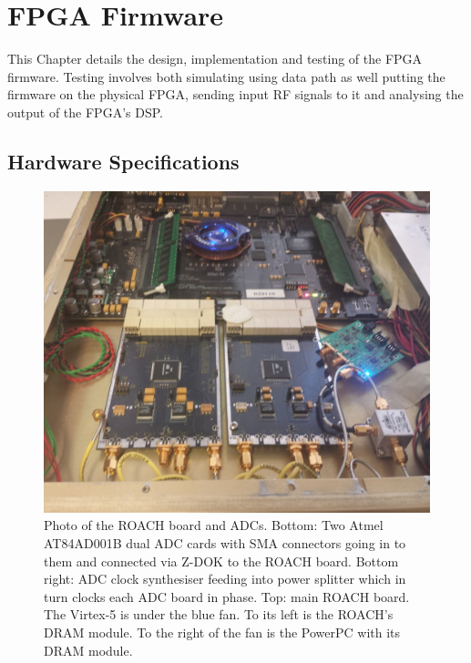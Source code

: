 \chapter{FPGA Firmware}
\label{ch:firmware-design}
\graphicspath{{./img/firmware/}}

This Chapter details the design, implementation and testing of the FPGA firmware. Testing involves both simulating using data path as well putting the firmware on the physical FPGA, sending input RF signals to it and analysing the output of the FPGA's DSP.

\section{Hardware Specifications}

\begin{figure}
  \centering
  \includegraphics[width=\textwidth]{roach-photo}
  \caption{Photo of the ROACH board and ADCs. Bottom: Two Atmel AT84AD001B dual ADC cards with SMA connectors going in to them and connected via Z-DOK to the ROACH board. Bottom right: ADC clock synthesiser feeding into power splitter which in turn clocks each ADC board in phase. Top: main ROACH board. The Virtex-5 is under the blue fan. To its left is the ROACH's DRAM module. To the right of the fan is the PowerPC with its DRAM module.}
  \label{fig:firmware:roach-photo}
\end{figure}

